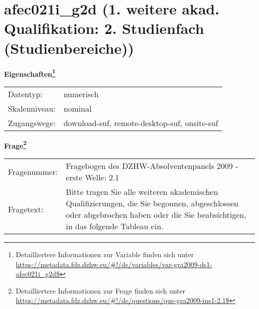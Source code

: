 
    \setcounter{footnote}{0}

    \vspace*{-1.8cm}
	\section{afec021i\_g2d (1. weitere akad. Qualifikation: 2. Studienfach (Studienbereiche))}
	\label{section:afec021i_g2d}



    \vspace*{0.5cm}
    \noindent\textbf{Eigenschaften\footnote{Detailliertere Informationen zur Variable finden sich unter
		\url{https://metadata.fdz.dzhw.eu/\#!/de/variables/var-gra2009-ds1-afec021i_g2d$}}}\\
	\begin{tabularx}{\hsize}{@{}lX}
	Datentyp: & numerisch \\
	Skalenniveau: & nominal \\
	Zugangswege: &
	  download-suf, 
	  remote-desktop-suf, 
	  onsite-suf
 \\
    \end{tabularx}



				\vspace*{0.5cm}
                \noindent\textbf{Frage\footnote{Detailliertere Informationen zur Frage finden sich unter
		              \url{https://metadata.fdz.dzhw.eu/\#!/de/questions/que-gra2009-ins1-2.1$}}}\\
				\begin{tabularx}{\hsize}{@{}lX}
					Fragenummer: &
					  Fragebogen des DZHW-Absolventenpanels 2009 - erste Welle:
					  2.1
 \\
					Fragetext: & Bitte tragen Sie alle weiteren akademischen Qualifizierungen, die Sie begonnen, abgeschlossen oder abgebrochen haben oder die Sie beabsichtigen, in das folgende Tableau ein. \\
				\end{tabularx}





